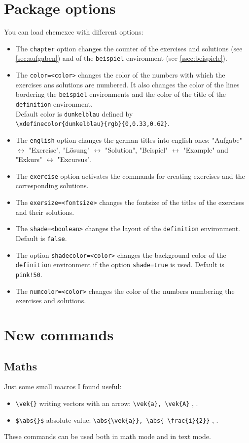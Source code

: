 \documentclass[DIV10]{scrartcl}
\newcommand{\option}[1]{`\texttt{#1}'\xspace}
\newcommand{\CEx}[1][8]{%
{\color{dunkelrot}\fontfamily{pag}\fontsize{#1}{#1}\selectfont chemexec}\xspace
}
\begin{document}
\section{Package options}
You can load \CEx with different options:
\begin{itemize}
 \item The \verb=chapter= option changes the counter of the exercises and solutions (see \ref{sec:aufgaben}) and of the \verb=beispiel= environment (see \ref{ssec:beispiele}).
 \item The \verb+color=<color>+ changes the color of the numbers with which the exercises ans solutions are numbered. It also changes the color of the lines bordering the \verb=beispiel= environments and the color of the title of the \verb=definition= environment.\\
 Default color is \verb=dunkelblau= defined by\\
 \verb=\xdefinecolor{dunkelblau}{rgb}{0,0.33,0.62}=.
 \item The \verb=english= option changes the german titles into english ones: "Aufgabe" $\leftrightarrow$ "Exercise", "L\"osung" $\leftrightarrow$ "Solution", "Beispiel" $\leftrightarrow$ "Example" and "Exkurs" $\leftrightarrow$ "Excursus".
 \item The \verb=exercise= option activates the commands for creating exercises and the corresponding solutions.
 \item The \verb+exersize=<fontsize>+ changes the fontsize of the titles of the exercises and their solutions.
 \item The \verb+shade=<boolean>+ changes the layout of the \verb=definition= environment. Default is \verb=false=.
 \item The option \verb+shadecolor=<color>+ changes the background color of the\\ \verb=definition= environment if the option \verb+shade=true+ is used. Default is \verb=pink!50=.
 \item The \verb+numcolor=<color>+ changes the color of the numbers numbering the exercises and solutions.
\end{itemize}

\section{New commands}
\subsection{Maths}
Just some small macros I found useful:
\begin{itemize}
 \item \verb=\vek{}= writing vectors with an arrow: \verb=\vek{a}, \vek{A}= , .
 \item \verb=$\abs{}$= absolute value: \verb=\abs{\vek{a}}, \abs{-\frac{i}{2}}= , .
\end{itemize}
These commands can be used both in math mode and in text mode.
\end{document}
